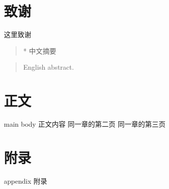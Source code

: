\documentclass[notabs,nottoc,degree=undergraduate,bibstyle=numerical,font=empty]{xmuthesis}
\begin{document}
\maketitle
\chapter*{致谢}
这里致谢
\begin{abstract}*
    中文摘要
\end{abstract}
\begin{abstract}
    English abstract.
\end{abstract}
\xmutableofcontents %
\chapter{正文}{main body}
正文内容
\newpage
同一章的第二页
\newpage
同一章的第三页
\nocite{*}

\appendix
\chapter{附录}{appendix}
附录
\end{document}
